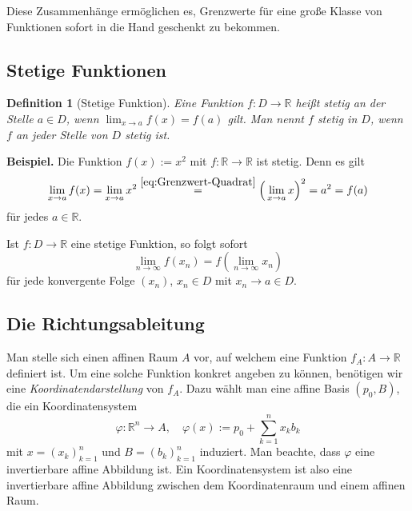 \documentclass[a4paper,11pt,fleqn,twoside]{scrartcl}
\numberwithin{equation}{section}
\newcommand{\R}{\mathbb R}
\newcommand{\strong}[1]{{\normalfont\sffamily\bfseries #1}}
\theoremstyle{rmbox}
\newtheorem{Definition}{Definition}
\begin{document}
Diese Zusammenhänge ermöglichen es, Grenzwerte für eine große
Klasse von Funktionen sofort in die Hand geschenkt zu bekommen.

\subsection{Stetige Funktionen}
\begin{Definition}[Stetige Funktion]
Eine Funktion $f\colon D\to\R$ heißt \emph{stetig} an der Stelle
$a\in D$, wenn $\lim_{x\to a} f(x)=f(a)$ gilt. Man nennt $f$ stetig
in $D$, wenn $f$ an jeder Stelle von $D$ stetig ist.
\end{Definition}
\strong{Beispiel.} Die Funktion $f(x):=x^2$ mit $f\colon\R\to\R$
ist stetig. Denn es gilt
\begin{equation}
\lim_{x\to a} f(x) = \lim_{x\to a} x^2 \stackrel{\eqref{eq:Grenzwert-Quadrat}}= \Big(\lim_{x\to a} x\Big)^2
= a^2 = f(a)
\end{equation}
für jedes $a\in\R$.

Ist $f\colon D\to\R$ eine stetige Funktion, so folgt sofort
\begin{equation}
\lim_{n\to\infty} f(x_n) = f(\lim_{n\to\infty} x_n)
\end{equation}
für jede konvergente Folge $(x_n)$, $x_n\in D$ mit $x_n\to a\in D$.

\subsection{Die Richtungsableitung}
Man stelle sich einen affinen Raum $A$ vor, auf welchem eine
Funktion $f_A\colon A\to\R$ definiert ist.
Um eine solche Funktion konkret angeben zu können, benötigen
wir eine \emph{Koordinatendarstellung} von $f_A$. Dazu wählt man
eine affine Basis $(p_0,B)$, die ein Koordinatensystem%
\begin{equation}
\varphi\colon \R^n\to A,\quad\varphi(x) := p_0+\sum_{k=1}^n x_k b_k
\end{equation}
mit $x=(x_k)_{k=1}^n$ und $B=(b_k)_{k=1}^n$ induziert. Man beachte,
dass $\varphi$ eine invertierbare affine Abbildung ist. Ein
Koordinatensystem ist also eine invertierbare affine Abbildung
zwischen dem Koordinatenraum und einem affinen Raum.
\end{document}

